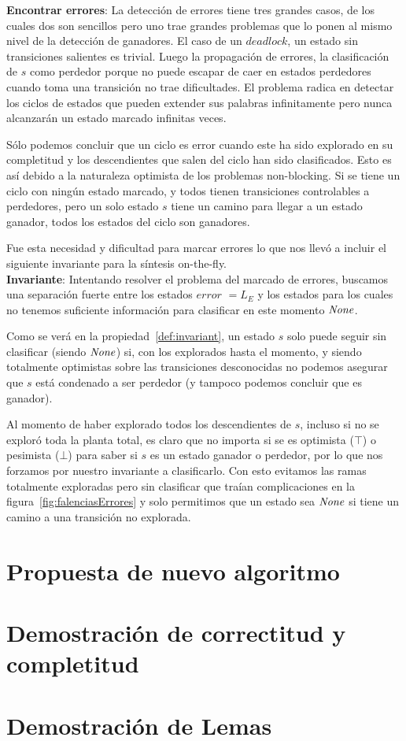 \textbf{Encontrar errores}: La detección de errores tiene tres grandes casos, de los cuales dos son sencillos pero uno trae grandes problemas que lo ponen al mismo nivel de la detección de ganadores. El caso de un $deadlock$, un estado sin transiciones salientes es trivial. Luego la propagación de errores, la clasificación de $s$ como perdedor porque no puede escapar de caer en estados perdedores cuando toma una transición no trae dificultades. El problema radica en detectar los ciclos de estados que pueden extender sus palabras infinitamente pero nunca alcanzarán un estado marcado infinitas veces. 

Sólo podemos concluir que un ciclo es error cuando este ha sido explorado en su completitud y los descendientes que salen del ciclo han sido clasificados. Esto es así debido a la naturaleza optimista de los problemas non-blocking. Si se tiene un ciclo con ningún estado marcado, y todos tienen transiciones controlables a perdedores, pero un solo estado $s$ tiene un camino para llegar a un estado ganador, todos los estados del ciclo son ganadores. %

Fue esta necesidad y dificultad para marcar errores lo que nos llevó a incluir el siguiente invariante para la síntesis on-the-fly.\\

\textbf{Invariante}: Intentando resolver el problema del marcado de errores, buscamos una separación fuerte entre los estados $error$ $= L_E$ y los estados para los cuales no tenemos suficiente información para clasificar en este momento $\mathit{None}$.

Como se verá en la propiedad~\ref{def:invariant}, un estado $s$ solo puede seguir sin clasificar (siendo $\mathit{None}$) si, con los explorados hasta el momento, y siendo totalmente optimistas sobre las transiciones desconocidas no podemos asegurar que $s$ está condenado a ser perdedor (y tampoco podemos concluir que es ganador).

Al momento de haber explorado todos los descendientes de $s$, incluso si no se exploró toda la planta total, es claro que no importa si se es optimista ($\top$) o pesimista ($\bot$) para saber si $s$ es un estado ganador o perdedor, por lo que nos forzamos por nuestro invariante a clasificarlo. Con esto evitamos las ramas totalmente exploradas pero sin clasificar que traían complicaciones en la figura~\ref{fig:falenciasErrores} y solo permitimos que un estado sea $\mathit{None}$ si tiene un camino a una transición no explorada.

\section{Propuesta de nuevo algoritmo}



\FloatBarrier

\section{Demostración de correctitud y completitud}


\section{Demostración de Lemas}

